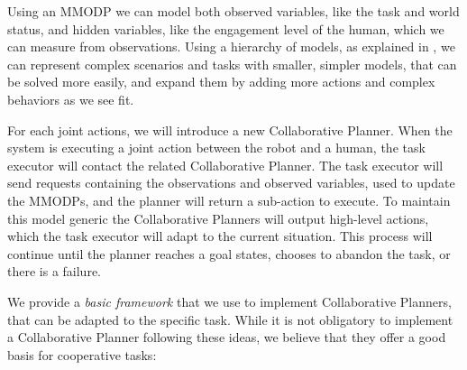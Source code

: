 Using an MMODP we can model both observed variables, like the task and world status, and hidden variables, like the engagement level of the human, which we can measure from observations. Using a hierarchy of models, as explained in \cite{pineau2001hierarchical}, we can represent complex scenarios and tasks with smaller, simpler models, that can be solved more easily, and expand them by adding more actions and complex behaviors as we see fit.

For each joint actions, we will introduce a new Collaborative Planner. When the system is executing a joint action between the robot and a human, the task executor will contact the related Collaborative Planner.  The task executor will send requests containing the observations and observed variables, used to update the MMODPs, and the planner will return a sub-action to execute. To maintain this model generic the Collaborative Planners will output high-level actions, which the task executor will adapt to the current situation. This process will continue until the planner reaches a goal states, chooses to abandon the task, or there is a failure.

We provide a \textit{basic framework} that we use to implement Collaborative Planners, that can be adapted to the specific task. While it is not obligatory to implement a Collaborative Planner following these ideas, we believe that they offer a good basis for cooperative tasks:


